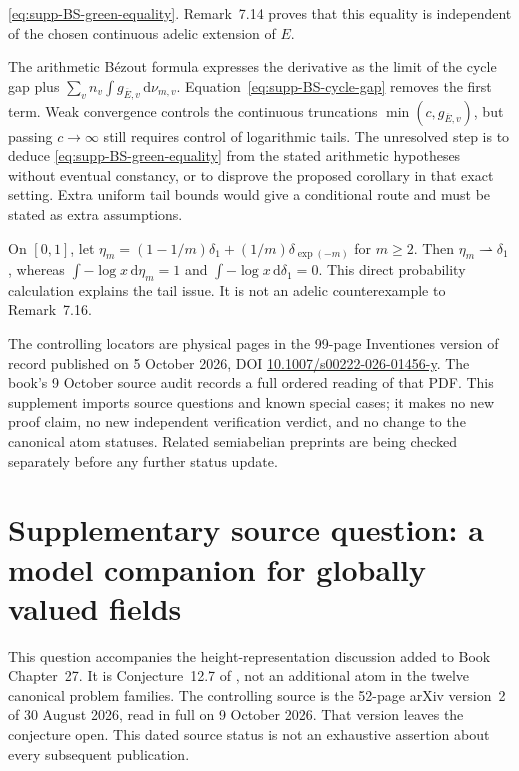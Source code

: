 \documentclass[11pt,a4paper]{article}
\theoremstyle{definition}
\theoremstyle{remark}
\newcommand{\rd}{\mathrm d}
\begin{document}
\begin{description}
\eqref{eq:supp-BS-green-equality}. Remark~7.14 proves that this equality
is independent of the chosen continuous adelic extension of $E$.
\item[The missing passage.]
The arithmetic B\'ezout formula expresses the derivative as the limit
of the cycle gap plus
$\sum_v n_v\int g_{\overline E,v}\,\rd\nu_{m,v}$.
Equation~\eqref{eq:supp-BS-cycle-gap} removes the first term.
Weak convergence controls the continuous truncations
$\min(c,g_{\overline E,v})$, but passing $c\to\infty$ still requires
control of logarithmic tails. The unresolved step is to deduce
\eqref{eq:supp-BS-green-equality} from the stated arithmetic hypotheses
without eventual constancy, or to disprove the proposed corollary in
that exact setting. Extra uniform tail bounds would give a conditional
route and must be stated as extra assumptions.
\item[Elementary obstruction to a weak-convergence-only argument.]
On $[0,1]$, let
$\eta_m=(1-1/m)\delta_1+(1/m)\delta_{\exp(-m)}$ for $m\geq2$.
Then $\eta_m\rightharpoonup\delta_1$, whereas
$\int-\log x\,\rd\eta_m=1$ and
$\int-\log x\,\rd\delta_1=0$.
This direct probability calculation explains the tail issue. It is not
an adelic counterexample to Remark~7.16.
\end{description}

The controlling locators are physical pages in the 99-page Inventiones
version of record published on 5 October 2026, DOI
\href{https://doi.org/10.1007/s00222-026-01456-y}{10.1007/s00222-026-01456-y}.
The book's 9 October source audit records a full ordered reading of that
PDF. This supplement imports source questions and known special cases;
it makes no new proof claim, no new independent verification verdict,
and no change to the canonical atom statuses. Related semiabelian
preprints are being checked separately before any further status update.

\clearpage
\section*{Supplementary source question: a model companion for globally valued fields}
\label{supp:GVF-model-companion}
This question accompanies the height-representation discussion added to
Book Chapter~27. It is Conjecture~12.7 of
\cite{BDHS26GVFFoundationsV2}, not an additional atom in the twelve
canonical problem families. The controlling source is the 52-page
arXiv version~2 of 30 August 2026, read in full on 9 October 2026.
That version leaves the conjecture open. This dated source status is
not an exhaustive assertion about every subsequent publication.
\end{document}
